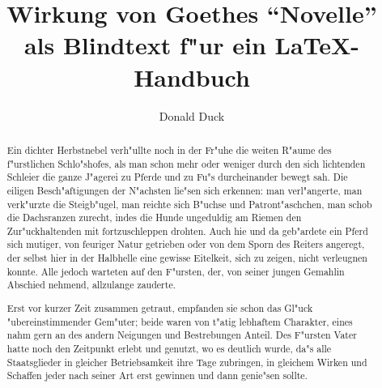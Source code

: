 \documentclass[color]{tudbook}
\begin{document}
\author{Donald Duck}
\title{Wirkung von Goethes "`Novelle"' als Blindtext f"ur ein \LaTeX-Handbuch}
\dissertation
\maketitle

\begin{abstract}
    Ein dichter Herbstnebel verh"ullte noch in der Fr"uhe die weiten R"aume des
    f"urstlichen Schlo"shofes, als man schon mehr oder weniger durch den sich
    lichtenden Schleier die ganze J"agerei zu Pferde und zu Fu"s durcheinander
    bewegt sah. Die eiligen Besch"aftigungen der N"achsten lie"sen sich erkennen:
    man verl"angerte, man verk"urzte die Steigb"ugel, man reichte sich B"uchse
    und Patront"aschchen, man schob die Dachsranzen zurecht, indes die Hunde
    ungeduldig am Riemen den Zur"uckhaltenden mit fortzuschleppen drohten. Auch
    hie und da geb"ardete ein Pferd sich mutiger, von feuriger Natur getrieben
    oder von dem Sporn des Reiters angeregt, der selbst hier in der Halbhelle
    eine gewisse Eitelkeit, sich zu zeigen, nicht verleugnen konnte. Alle jedoch
    warteten auf den F"ursten, der, von seiner jungen Gemahlin Abschied nehmend,
    allzulange zauderte.

    Erst vor kurzer Zeit zusammen getraut, empfanden sie schon das Gl"uck
    "ubereinstimmender Gem"uter; beide waren von t"atig lebhaftem Charakter, eines
    nahm gern an des andern Neigungen und Bestrebungen Anteil. Des F"ursten Vater
    hatte noch den Zeitpunkt erlebt und genutzt, wo es deutlich wurde, da"s alle
    Staatsglieder in gleicher Betriebsamkeit ihre Tage zubringen, in gleichem
    Wirken und Schaffen jeder nach seiner Art erst gewinnen und dann genie"sen sollte.
\end{abstract}
\end{document}
